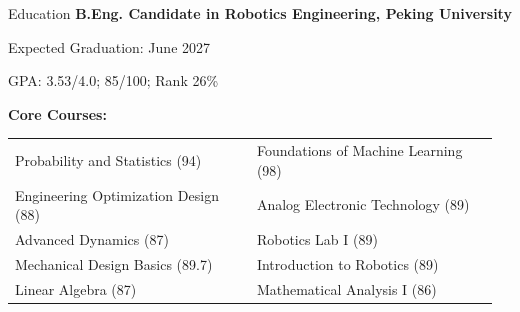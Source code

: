 \begin{rubric}{Education}
\entry*[2023 -- present]%
	\textbf{B.Eng. Candidate in Robotics Engineering, Peking University}
\par Expected Graduation: June 2027
 \par GPA: 3.53/4.0; 85/100; Rank 26\%
	\par \textbf{Core Courses:}
	\par\vspace{0.5ex} %
	\begin{tabular}{@{}p{0.48\linewidth} p{0.48\linewidth}@{}}
		Probability and Statistics (94) & Foundations of Machine Learning (98) \\
		Engineering Optimization Design (88) & Analog Electronic Technology (89) \\
		Advanced Dynamics (87) & Robotics Lab I (89) \\
		Mechanical Design Basics (89.7) & Introduction to Robotics (89) \\
		Linear Algebra (87) & Mathematical Analysis I (86)
	\end{tabular}
\end{rubric}